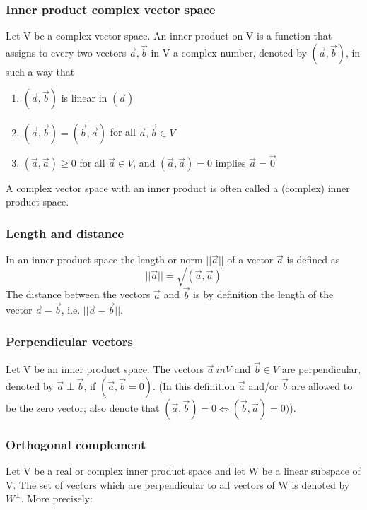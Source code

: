 \documentclass{article}
\begin{document}
		\subsubsection{Inner product complex vector space}
		Let V be a complex vector space. An inner product on V is a function that assigns to every two vectors $\vec{a}, \vec{b}$ in V a complex number, denoted by $(\vec{a}, \vec{b})$, in such a way that
		\begin{enumerate}
			\item $(\vec{a}, \vec{b})$ is linear in $(\vec{a})$
			\item $(\vec{a},\vec{b}) = \overline{(\vec{b}, \vec{a})}$ for all $\vec{a},\vec{b} \in V$
			\item $(\vec{a}, \vec{a}) \ge 0$ for all $\vec{a} \in V$, and $(\vec{a},\vec{a})=0$ implies $\vec{a} = \vec{0}$
		\end{enumerate}
		A complex vector space with an inner product is often called a (complex) inner product space.
			
		\subsubsection{Length and distance}
		In an inner product space the length or norm $||\vec{a}||$ of a vector $\vec{a}$ is defined as 
		\begin{equation*}
			||\vec{a}|| = \sqrt{(\vec{a}, \vec{a})}
		\end{equation*}
		The distance between the vectors $\vec{a}$ and $\vec{b}$ is by definition the length of the vector $\vec{a} - \vec{b}$, i.e. $||\vec{a}-\vec{b}||$.
		
		\subsubsection{Perpendicular vectors}
		Let V be an inner product space. The vectors $\vec{a} \ in V$ and $\vec{b} \in V$ are perpendicular, denoted by $\vec{a} \perp \vec{b}$, if $(\vec{a}, \vec{b} = 0)$. (In this definition $\vec{a}$ and/or $\vec{b}$ are allowed to be the zero vector; also denote that $(\vec{a}, \vec{b}) = 0 \iff (\vec{b}, \vec{a}) = 0)$).
		
		\subsubsection{Orthogonal complement}
		Let V be a real or complex inner product space and let W be a linear subspace of V. The set of vectors which are perpendicular to all vectors of W is denoted by $W^\bot$. More precisely:
		
\end{document}
